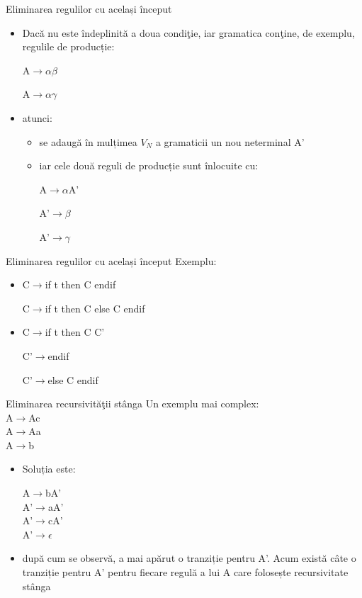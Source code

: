 \documentclass[pdf]{beamer}
\begin{document}
\begin{frame}{Eliminarea regulilor cu același început}
\begin{itemize}
\item
Dacă nu este îndeplinită a doua condiţie, iar gramatica conţine, de exemplu, regulile de producție:

A$\rightarrow\alpha\beta$

A$\rightarrow\alpha\gamma$

\item
atunci: 

\begin{itemize}
\item
se adaugă în mulțimea $V_N$ a gramaticii un nou neterminal A’

\item
iar cele două reguli de producție sunt înlocuite cu:

A$\rightarrow\alpha$A'

A'$\rightarrow\beta$

A'$\rightarrow\gamma$
\end{itemize}
\end{itemize}
\end{frame}



\begin{frame}{Eliminarea regulilor cu același început}
Exemplu:
\begin{itemize}
\item
C$\rightarrow$if t then C endif

C$\rightarrow$if t then C else C endif

\item
C$\rightarrow$if t then C C'

C'$\rightarrow$endif

C'$\rightarrow$else C endif
\end{itemize}
\end{frame}



\begin{frame}{Eliminarea recursivităţii stânga}
Un exemplu mai complex:\\

A$\rightarrow$Ac\\
A$\rightarrow$Aa\\
A$\rightarrow$b\\

\begin{itemize}
\item
Soluția este:

A$\rightarrow$bA'\\
A'$\rightarrow$aA'\\
A'$\rightarrow$cA'\\
A'$\rightarrow \epsilon$\\
\item
după cum se observă, a mai apărut o tranziție pentru A'. Acum există câte o tranziție pentru A' pentru fiecare regulă a lui A care folosește recursivitate stânga
\end{itemize}
\end{frame}
\end{document}
